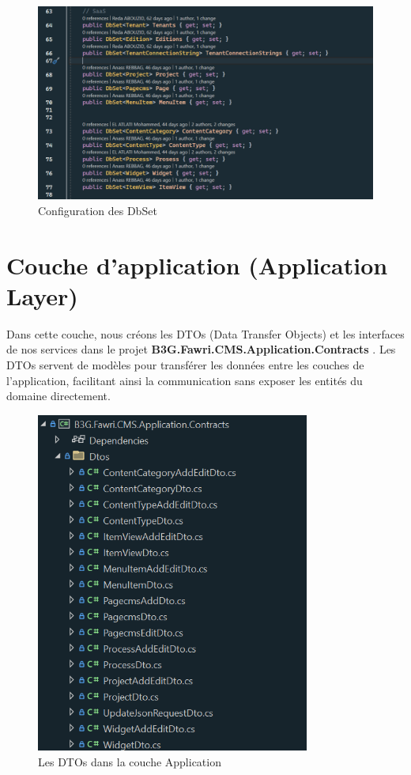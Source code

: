 \begin{figure}[H]
    \centering
    \includegraphics[width=17cm]{Figures/db set code.PNG}
    \caption{Configuration des DbSet}
\end{figure}

\section{Couche d'application (Application Layer)}

Dans cette couche, nous créons les DTOs (Data Transfer Objects) et les interfaces de nos services dans le projet \textbf{B3G.Fawri.CMS.Application.Contracts} . Les DTOs servent de modèles pour transférer les données entre les couches de l'application, facilitant ainsi la communication sans exposer les entités du domaine directement.
\begin{figure}[H]
    \centering
    \includegraphics[width=9cm]{Figures/dtos.PNG}
    \caption{Les DTOs dans la couche Application}
\end{figure}

